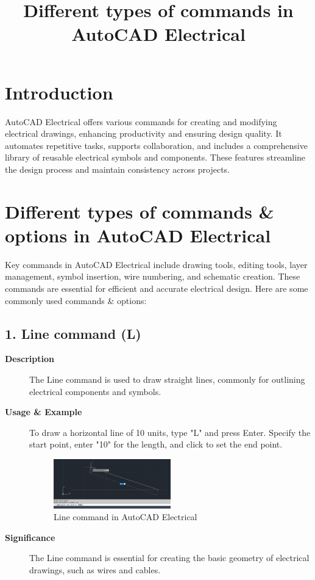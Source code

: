 \documentclass[12pt]{article}
\title{Different types of commands in AutoCAD Electrical}
\author{}
\date{}
\begin{document}


\pagebreak

\tableofcontents

\pagebreak
{}
\maketitle

\section*{Introduction}
AutoCAD Electrical offers various commands for creating and modifying electrical drawings, enhancing productivity and ensuring design quality. It automates repetitive tasks, supports collaboration, and includes a comprehensive library of reusable electrical symbols and components. These features streamline the design process and maintain consistency across projects.

\section*{Different types of commands \& options in AutoCAD Electrical}
Key commands in AutoCAD Electrical include drawing tools, editing tools, layer management, symbol insertion, wire numbering, and schematic creation. These commands are essential for efficient and accurate electrical design. Here are some commonly used commands \& options:

\subsection*{1. Line command (L)}
\begin{description}
    \item [\textbf{Description}] The Line command is used to draw straight lines, commonly for outlining electrical components and symbols.
    \item [\textbf{Usage \& Example}] To draw a horizontal line of 10 units, type "L" and press Enter. Specify the start point, enter "10" for the length, and click to set the end point.
          \begin{figure}[H]
              \centering
              \includegraphics[width=0.5\textwidth]{line_command.png}
              \caption{Line command in AutoCAD Electrical}
          \end{figure}
    \item [\textbf{Significance}] The Line command is essential for creating the basic geometry of electrical drawings, such as wires and cables.
\end{description}
\end{document}
